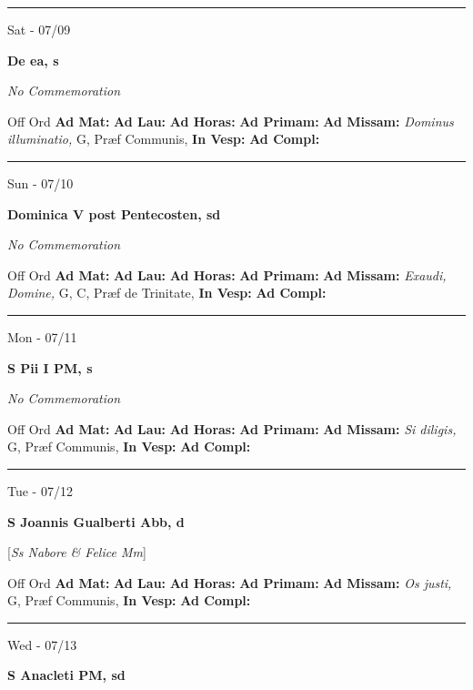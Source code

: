 \documentclass[letterpaper, 10pt]{article}
\begin{document}
\hrule
\begin{center}
Sat - 07/09
\end{center}\textbf{ \large De ea, \textnormal{\normalsize s}}

\textit{No Commemoration}\begin{justify}
Off Ord
\textbf{Ad Mat: }
\textbf{Ad Lau: }
\textbf{Ad Horas: }
\textbf{Ad Primam: }
\textbf{Ad Missam:} \textit{Dominus illuminatio, } G, Præf Communis, 
\textbf{In Vesp: }
\textbf{Ad Compl: }\end{justify}



\hrule
\begin{center}
Sun - 07/10
\end{center}\textbf{ \large Dominica V post Pentecosten, \textnormal{\normalsize sd}}

\textit{No Commemoration}\begin{justify}
Off Ord
\textbf{Ad Mat: }
\textbf{Ad Lau: }
\textbf{Ad Horas: }
\textbf{Ad Primam: }
\textbf{Ad Missam:} \textit{Exaudi, Domine, } G, C, Præf de Trinitate, 
\textbf{In Vesp: }
\textbf{Ad Compl: }\end{justify}



\hrule
\begin{center}
Mon - 07/11
\end{center}\textbf{ \large S Pii I PM, \textnormal{\normalsize s}}

\textit{No Commemoration}\begin{justify}
Off Ord
\textbf{Ad Mat: }
\textbf{Ad Lau: }
\textbf{Ad Horas: }
\textbf{Ad Primam: }
\textbf{Ad Missam:} \textit{Si diligis, } G, Præf Communis, 
\textbf{In Vesp: }
\textbf{Ad Compl: }\end{justify}



\hrule
\begin{center}
Tue - 07/12
\end{center}\textbf{ \large S Joannis Gualberti Abb, \textnormal{\normalsize d}}

[\textit{Ss Nabore \& Felice Mm}]
\begin{justify}
Off Ord
\textbf{Ad Mat: }
\textbf{Ad Lau: }
\textbf{Ad Horas: }
\textbf{Ad Primam: }
\textbf{Ad Missam:} \textit{Os justi, } G, Præf Communis, 
\textbf{In Vesp: }
\textbf{Ad Compl: }\end{justify}



\hrule
\begin{center}
Wed - 07/13
\end{center}\textbf{ \large S Anacleti PM, \textnormal{\normalsize sd}}
\end{document}
